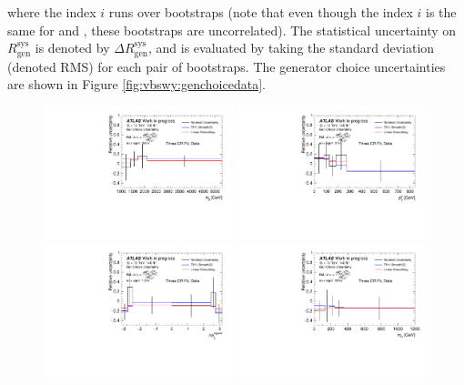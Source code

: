 where the index $i$ runs over bootstraps (note that even though the index $i$ is the same for \SHERPA and \MADGRAPH, these bootstraps are uncorrelated). The statistical uncertainty on $R^{\text{sys}}_{\text{gen}}$ is denoted by $\Delta R^{\text{sys}}_{\text{gen}}$, and is evaluated by taking the standard deviation (denoted RMS) for each pair of bootstraps. The \qcdwy generator choice uncertainties are shown in Figure \ref{fig:vbswy:genchoicedata}. 

\begin{figure}[t]
  \centering
  \includegraphics[width=0.49\textwidth]{plots/diffx/genchoice/data/sys_errors_mjj_generator_choice_3cr.pdf}
  \includegraphics[width=0.49\textwidth]{plots/diffx/genchoice/data/sys_errors_jj_pt_generator_choice_3cr.pdf}
  \includegraphics[width=0.49\textwidth]{plots/diffx/genchoice/data/sys_errors_jj_dphi_generator_choice_3cr.pdf}
  \includegraphics[width=0.49\textwidth]{plots/diffx/genchoice/data/sys_errors_ly_m_generator_choice_3cr.pdf}

\end{figure}
